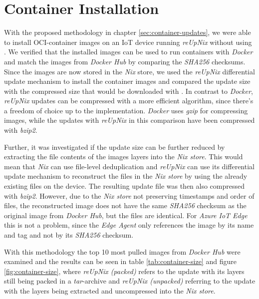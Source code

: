 \section{Container Installation}
With the proposed methodology in chapter \ref{sec:container-updates}, we were able
to install \ac{OCI}-container images
on an \ac{IoT} device running \textit{reUpNix} without using .
We verified that the installed images can be used to run containers with \textit{Docker}
and match the images from \textit{Docker Hub} by comparing the \textit{SHA256} checksums.
Since the images are now stored in the \textit{Nix} store, we used the \textit{reUpNix}
differential update mechanism to install the container images and compared the update size
with the compressed size that would be downloaded with . In
contrast to \textit{Docker}, \textit{reUpNix} updates can be compressed with a
more efficient algorithm, since there's a freedom of choice up to the implementation.
\textit{Docker} uses \textit{gzip} for compressing images, while the updates with
\textit{reUpNix} in this comparison have been compressed with \textit{bzip2}.

Further, it was investigated if the update size can be further reduced by extracting
the file contents of the images layers into the \textit{Nix store}. This would mean
that \textit{Nix} can use file-level deduplication and \textit{reUpNix} can use
its differential update mechanism to reconstruct the files in the \textit{Nix store}
by using the already existing files on the device. The resulting update file was
then also compressed with \textit{bzip2}. However, due to the \textit{Nix store}
not preserving timestamps and order of files,
the reconstructed image does not have the same \textit{SHA256} checksum as the
original image from \textit{Docker Hub}, but the files are identical. For
\textit{Azure IoT Edge} this is not a problem, since the \textit{Edge Agent} only
references the image by its name and tag and not by its \textit{SHA256} checksum.


With this methodology the top 10 most pulled images from \textit{Docker Hub}
were examined and the results can be seen in table \ref{tab:container-size} and figure
\ref{fig:container-size}, where \textit{reUpNix (packed)} refers to the update
with its layers still being packed in a \textit{tar}-archive and \textit{reUpNix (unpacked)}
referring to the update with the layers being extracted and uncompressed into the
\textit{Nix store}.
\clearpage

